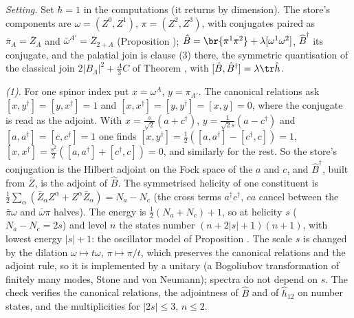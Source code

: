\emph{Setting.} Set $\hbar = 1$ in the computations (it returns by dimension). The store's components are $\omega = (Z^{0}, Z^{1})$, $\pi = (Z^{2}, Z^{3})$, with conjugates paired as $\bar\pi_{A} = \bar Z_{A}$ and $\bar\omega^{A'} = \bar Z_{2+A}$ (Proposition ); $\hat B = \br{\pi^{1}\pi^{2}} + \lambda[\omega^{1}\omega^{2}]$, $\hat B^{\dagger}$ its conjugate, and the palatial join is clause (3) there, the symmetric quantisation of the classical join $2|B_{\Lambda}|^{2} + \tfrac{\Lambda}{3}C$ of Theorem , with $[\hat B, \hat B^{\dagger}] = \lambda\tr\hat h$.

\emph{(1).} For one spinor index put $x = \omega^{A}$, $y = \pi_{A'}$. The canonical relations ask $[x, y^{\dagger}] = [y, x^{\dagger}] = 1$ and $[x, x^{\dagger}] = [y, y^{\dagger}] = [x, y] = 0$, where the conjugate is read as the adjoint. With $x = \tfrac{s}{\sqrt2}(a + c^{\dagger})$, $y = \tfrac{1}{\sqrt2 s}(a - c^{\dagger})$ and $[a, a^{\dagger}] = [c, c^{\dagger}] = 1$ one finds $[x, y^{\dagger}] = \tfrac12([a, a^{\dagger}] - [c^{\dagger}, c]) = 1$, $[x, x^{\dagger}] = \tfrac{s^{2}}{2}([a, a^{\dagger}] + [c^{\dagger}, c]) = 0$, and similarly for the rest. So the store's conjugation is the Hilbert adjoint on the Fock space of the $a$ and $c$, and $\hat B^{\dagger}$, built from $\bar Z$, is the adjoint of $\hat B$. The symmetrised helicity of one constituent is $\tfrac12\sum_{\alpha}(\bar Z_{\alpha}Z^{\alpha} + Z^{\alpha}\bar Z_{\alpha}) = N_{a} - N_{c}$ (the cross terms $a^{\dagger}c^{\dagger}$, $ca$ cancel between the $\bar\pi\omega$ and $\bar\omega\pi$ halves). The energy is $\tfrac12(N_{a} + N_{c}) + 1$, so at helicity $s$ ($N_{a} - N_{c} = 2s$) and level $n$ the states number $(n + 2|s| + 1)(n + 1)$, with lowest energy $|s| + 1$: the oscillator model of Proposition . The scale $s$ is changed by the dilation $\omega \mapsto t\omega$, $\pi \mapsto \pi/t$, which preserves the canonical relations and the adjoint rule, so it is implemented by a unitary (a Bogoliubov transformation of finitely many modes, Stone and von Neumann); spectra do not depend on $s$. The check verifies the canonical relations, the adjointness of $\hat B$ and of $\hat h_{12}$ on number states, and the multiplicities for $|2s| \le 3$, $n \le 2$.

